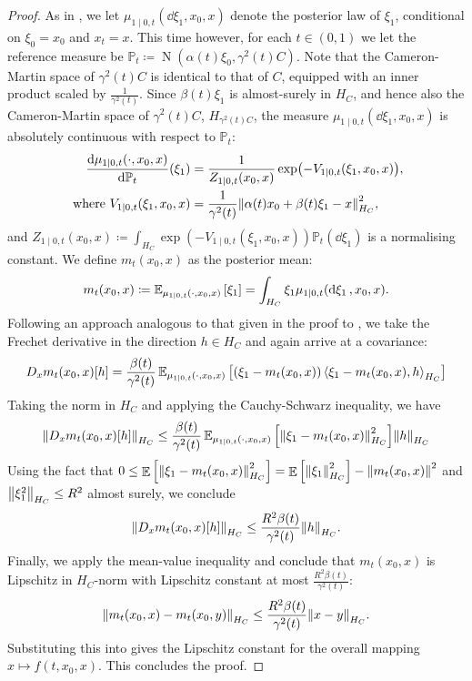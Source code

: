 \begin{proof}
  As in , we let \(\mu_{1 \mid 0, t}(\dd{\xi_{1}}, x_{0}, x)\) denote the posterior law of \(\xi_{1}\), conditional on \(\xi_{0} = x_{0}\) and \(x_{t} = x\). This time however, for each \(t \in (0, 1)\) we let the reference measure be \(\mathbb{P}_{t} \coloneqq \operatorname{N}(\alpha(t) \xi_{0}, \gamma^{2}(t) C)\). Note that the Cameron-Martin space of \(\gamma^{2}(t)C\) is identical to that of \(C\), equipped with an inner product scaled by \(\frac{1}{\gamma^{2}(t)}\). Since \(\beta(t) \xi_{1}\) is almost-surely in \(H_{C}\), and hence also the Cameron-Martin space of \(\gamma^{2}(t)C\), \(H_{\gamma^{2}(t)C}\), the measure \(\mu_{1 \mid 0, t}(\dd{\xi_{1}}, x_{0}, x)\) is absolutely continuous with respect to \(\mathbb{P}_{t}\):
  \begin{align*}
    \dv{\mu_{1 \mid 0, t}(\cdot, x_{0}, x)}{\mathbb{P}_{t}}{}(\xi_{1}) &= \frac{1}{Z_{1 \mid 0, t}(x_{0}, x)}\exp(-V_{1 \mid 0, t}(\xi_{1}, x_{0}, x)), \\
    \text{ where } V_{1 \mid 0, t}(\xi_{1}, x_{0}, x) &= \frac{1}{\gamma^{2}(t)} \norm{\alpha(t) x_{0} + \beta(t) \xi_{1} - x}_{H_{C}}^{2},
  \end{align*}
  and \(Z_{1 \mid 0, t}(x_{0}, x) \coloneqq \int_{H_{C}} \exp(-V_{1 \mid 0, t}(\xi_{1}, x_{0}, x)) \mathbb{P}_{t}(\dd{\xi_{1}})\) is a normalising constant. We define \(m_{t}(x_{0}, x)\) as the posterior mean:
  \[
    m_{t}(x_{0}, x) \coloneqq \mathop{\mathbb{E}_{\mu_{1 \mid 0, t}(\cdot, x_{0}, x)}}\qty[\xi_{1}] = \int_{H_{C}} \xi_{1} \mu_{1 \mid 0, t}(\dd{\xi_{1}}, x_{0}, x).
  \]
  Following an approach analogous to that given in the proof to , we take the Frechet derivative in the direction \(h \in H_{C}\) and again arrive at a covariance:
  \[
    D_{x} m_{t}(x_{0}, x)[h] = \frac{\beta(t)}{\gamma^{2}(t)} \mathop{\mathbb{E}_{\mu_{1 \mid 0, t}(\cdot, x_{0}, x)}}\qty[ (\xi_{1} - m_{t}(x_{0}, x))\ev{\xi_{1} - m_{t}(x_{0}, x), h}_{H_{C}}]
  \]
  Taking the norm in \(H_{C}\) and applying the Cauchy-Schwarz inequality, we have
  \[
    \norm{D_{x} m_{t}(x_{0}, x)[h]}_{H_{C}} \leq \frac{\beta(t)}{\gamma^{2}(t)} \mathop{\mathbb{E}_{\mu_{1 \mid 0, t}(\cdot, x_{0}, x)}}\qty[\norm{\xi_{1} - m_{t}(x_{0}, x)}_{H_{C}}^{2}] \norm{h}_{H_{C}}
  \]
  Using the fact that \(0 \leq \mathop{\mathbb{E}}\qty[\norm{\xi_{1} - m_{t}(x_{0}, x)}_{H_{C}}^{2}] = \mathop{\mathbb{E}}\qty[\norm{\xi_{1}}_{H_{C}}^{2}] - \norm{m_{t}(x_{0}, x)}^{2}\) and \(\norm{\xi_{1}^{2}}_{H_{C}} \leq R^{2}\) almost surely, we conclude
  \[
    \norm{D_{x} m_{t}(x_{0}, x)[h]}_{H_{C}} \leq \frac{R^{2} \beta(t)}{\gamma^{2}(t)} \norm{h}_{H_{C}}.
  \]
  Finally, we apply the mean-value inequality \citep[][Theorem 2.1.19]{berger1977nonlinearity} and conclude that \(m_{t}(x_{0}, x)\) is Lipschitz in \(H_{C}\)-norm with Lipschitz constant at most \(\frac{R^{2}\beta(t)}{\gamma^{2}(t)}\):
  \[
    \norm{m_{t}(x_{0}, x) - m_{t}(x_{0}, y)}_{H_{C}} \leq \frac{R^{2}\beta(t)}{\gamma^{2}(t)} \norm{x - y}_{H_{C}}.
  \]
  Substituting this into  gives the Lipschitz constant for the overall mapping \(x \mapsto f(t, x_{0}, x)\). This concludes the proof.
\end{proof}

